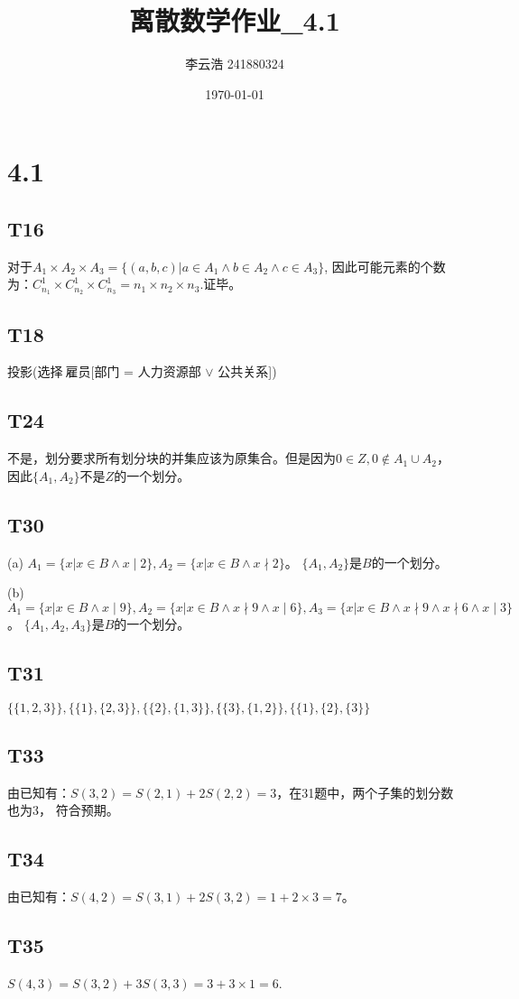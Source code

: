 \documentclass{article}
\title{离散数学作业\_4.1}
\author{李云浩 241880324}
\date{\today}
\begin{document}
\maketitle
\section{4.1}
\subsection{T16}
对于$A_1 \times A_2 \times A_3 = \{(a, b, c) | a \in A_1 \land b \in A_2 \land c \in A_3\}$,
因此可能元素的个数为：$C_{n_1}^1 \times C_{n_2}^1 \times C_{n_3}^1 = n_1 \times n_2 \times n_3$.证毕。
\subsection{T18}
投影(选择$\ $雇员[部门 = 人力资源部 $\lor$ 公共关系])
\subsection{T24}
不是，划分要求所有划分块的并集应该为原集合。但是因为$0 \in Z, 0 \notin A_1 \cup A_2$，
因此$\{A_1, A_2\}$不是$Z$的一个划分。
\subsection{T30}
(a) $A_1 = \{x | x \in B \land x \mid 2\}, A_2 = \{x | x \in B \land x \nmid 2\}$。
$\{A_1, A_2\}$是$B$的一个划分。

(b) $A_1 = \{x | x \in B \land x \mid 9\}, A_2 = \{x | x \in B \land x \nmid 9 \land x \mid 6\},
A_3 = \{x | x \in B \land x \nmid 9 \land x \nmid 6 \land x \mid 3\}$。
$\{A_1, A_2, A_3\}$是$B$的一个划分。
\subsection{T31}
$\{\{1, 2, 3\}\}, \{\{1\}, \{2, 3\}\}, \{\{2\}, \{1, 3\}\}, \{\{3\}, \{1, 2\}\}, 
\{\{1\}, \{2\}, \{3\}\}$
\subsection{T33}
由已知有：$S(3, 2) = S(2, 1) + 2S(2, 2) = 3$，在31题中，两个子集的划分数也为3，
符合预期。
\subsection{T34}
由已知有：$S(4, 2) = S(3, 1) + 2S(3, 2) = 1 + 2 \times 3 = 7$。
\subsection{T35}
$S(4, 3) = S(3, 2) + 3S(3 , 3) = 3 + 3 \times 1 = 6$.
\end{document}
